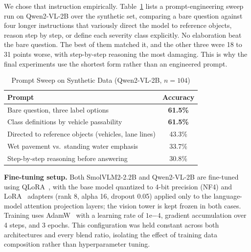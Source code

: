 \documentclass[conference]{IEEEtran}
\begin{document}
We chose that instruction empirically. Table~\ref{tab:prompts} lists a prompt-engineering sweep run on Qwen2-VL-2B over the synthetic set, comparing a bare question against four longer instructions that variously direct the model to reference objects, reason step by step, or define each severity class explicitly. No elaboration beat the bare question. The best of them matched it, and the other three were 18 to 31 points worse, with step-by-step reasoning the most damaging. This is why the final experiments use the shortest form rather than an engineered prompt.

\begin{table}[t]
\caption{Prompt Sweep on Synthetic Data (Qwen2-VL-2B, $n=104$)}
\label{tab:prompts}
\centering
\begin{tabular}{lc}
\toprule
\textbf{Prompt} & \textbf{Accuracy} \\
\midrule
Bare question, three label options & \textbf{61.5\%} \\
Class definitions by vehicle passability & \textbf{61.5\%} \\
Directed to reference objects (vehicles, lane lines) & 43.3\% \\
Wet pavement vs.\ standing water emphasis & 33.7\% \\
Step-by-step reasoning before answering & 30.8\% \\
\bottomrule
\end{tabular}
\end{table}

\textbf{Fine-tuning setup.} Both SmolVLM2-2.2B and Qwen2-VL-2B are fine-tuned using QLoRA~\cite{dettmers2023qlora}, with the base model quantized to 4-bit precision (NF4) and LoRA~\cite{hu2021lora} adapters (rank 8, alpha 16, dropout 0.05) applied only to the language-model attention projection layers; the vision tower is kept frozen in both cases. Training uses AdamW~\cite{loshchilov2019decoupled} with a learning rate of $1\mathrm{e}{-4}$, gradient accumulation over 4 steps, and 3 epochs. This configuration was held constant across both architectures and every blend ratio, isolating the effect of training data composition rather than hyperparameter tuning.
\end{document}
